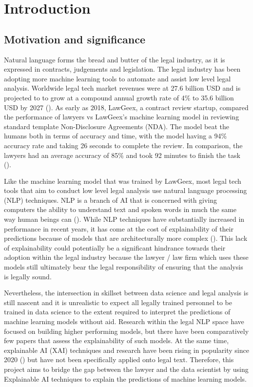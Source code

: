 
\chapter{Introduction} %

\label{chapter1} %

\section{Motivation and significance}
Natural language forms the bread and butter of the legal industry, as it is expressed in contracts, judgements and legislation. The legal industry has been adopting more machine learning tools to automate and assist low level legal analysis. Worldwide legal tech market revenues were at 27.6 billion USD and is projected to to grow at a compound annual growth rate of 4\% to 35.6 billion USD by 2027 (\cite{statista}). As early as 2018, LawGeex, a contract review startup, compared the performance of lawyers vs LawGeex's machine learning model in reviewing standard template Non-Disclosure Agreements (NDA). The model beat the humans both in terms of accuracy and time, with the model having a 94\% accuracy rate and taking 26 seconds to complete the review. In comparison, the lawyers had an average accuracy of 85\% and took 92 minutes to finish the task (\cite{lawgeex}). 

Like the machine learning model that was trained by LawGeex, most legal tech tools that aim to conduct low level legal analysis use natural language processing (NLP) techniques. NLP is a branch of AI that is concerned with giving computers the ability to understand text and spoken words in much the same way human beings can (\cite{ibm_nlp}). While NLP techniques have substantially increased in performance in recent years, it has come at the cost of explainability of their predictions because of models that are architecturally more complex (\cite{zini2022}). This lack of explainability could potentially be a significant hindrance towards their adoption within the legal industry because the lawyer / law firm which uses these models still ultimately bear the legal responsibility of ensuring that the analysis is legally sound.

Nevertheless, the intersection in skillset between data science and legal analysis is still nascent and it is unrealistic to expect all legally trained personnel to be trained in data science to the extent required to interpret the predictions of machine learning models without aid. Research within the legal NLP space have focused on building higher performing models, but there have been comparatively few papers that assess the explainability of such models. At the same time, explainable AI (XAI) techniques and research have been rising in popularity since 2020 (\cite{linardatos2020}) but have not been specifically applied onto legal text. Therefore, this project aims to bridge the gap between the lawyer and the data scientist by using Explainable AI techniques to explain the predictions of machine learning models. 

